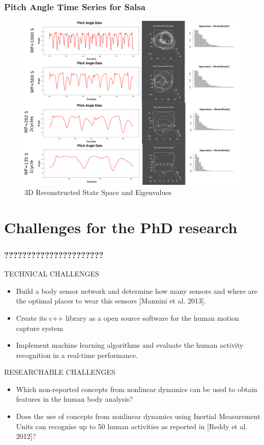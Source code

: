 \documentclass{beamer}
\theoremstyle{definition}
\begin{document}
\begin{frame}
\frametitle{Pitch Angle Time Series for Salsa}

\begin{figure}
\includegraphics[scale=0.129]{salsa}
\caption{3D Reconstructed State Space and Eigenvalues}
\end{figure}  
\end{frame}



\section{Challenges for the PhD research}


\begin{frame}
\frametitle{??????????????????????}

TECHNICAL CHALLENGES
 \begin{itemize}
 \item Build a body sensor network and determine how many sensors and 
 where are the optimal places to wear this sensors [Mannini et al. 2013].
 \item Create its c++ library as a open source software for the human motion capture system
 \item Implement machine learning algorithms and evaluate the human activity recognition in a real-time performance.
\end{itemize}

RESEARCHABLE CHALLENGES
  \begin{itemize}
   \item Which non-reported concepts from nonlinear dynamics 
  can be used to obtain features in the human body analysis?
  \item Does the use of concepts from nonlinear dynamics 
  using Inertial Measurement Units can recognise up to 50 human
  activities as reported in [Reddy et al. 2012]?
  \end{itemize}

\end{frame}
\end{document}
